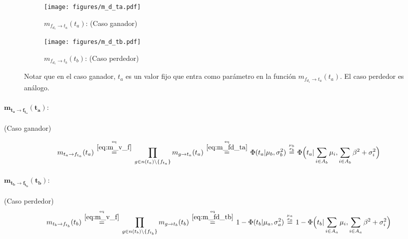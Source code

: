 \documentclass[article]{jss}
\newcommand\hfrac[2]{\genfrac{}{}{0pt}{}{#1}{#2}} %
\begin{document}
\begin{appendix}
\begin{figure}[t!]
\centering
  \begin{subfigure}[t]{0.48\textwidth}
  \texttt{[image: figures/m\_d\_ta.pdf]}
  \caption{$m_{f_{d_1} \rightarrow t_a}(t_a)$: (Caso ganador)}
  \label{fig:m_fd_ta}
  \end{subfigure}
  \begin{subfigure}[t]{0.48\textwidth}
  \texttt{[image: figures/m\_d\_tb.pdf]}
  \caption{$m_{f_{d_1} \rightarrow t_b}(t_b)$: (Caso perdedor)}
  \label{fig:m_fd_tb}
  \end{subfigure}
  \caption{Notar que en el caso ganador, $t_a$ es un valor fijo que entra como par\'ametro en la funci\'on $m_{f_{d_1} \rightarrow t_a}(t_a)$. El caso perdedor es an\'alogo.}
  \label{fig:m_fd_t}
\end{figure}

\paragraph{$\bm{m_{t_a \rightarrow f_{t_a}}(t_a)}:$} (Caso ganador)

\begin{equation}\label{eq:m_ta_ft}
\begin{split}
 m_{t_a \rightarrow f_{t_a}}(t_a) \overset{\hfrac{\text{eq}}{\ref{eq:m_v_f}}}{=} \prod_{g \in n(t_a) \setminus  \{f_{t_a} \}} m_{g \rightarrow t_a} (t_a)  \overset{\hfrac{\text{eq}}{\ref{eq:m_fd_ta}}}{=} \Phi(t_a|\mu_b,\sigma_b^2) \overset{\hfrac{\mu_b}{\sigma_b}}{=} \Phi \Big(t_a| \sum_{i \in A_b} \mu_i , \sum_{i \in A_b} \beta^2 + \sigma_i^2 \Big)
\end{split}
\end{equation}

\paragraph{$\bm{m_{t_b \rightarrow f_{t_b}}(t_b)}:$} (Caso perdedor)
\begin{equation}\label{eq:m_tb_ft}
\begin{split}
 m_{t_b \rightarrow f_{t_b}}(t_b) \overset{\hfrac{\text{eq}}{\ref{eq:m_v_f}}}{=} \prod_{g \in n(t_b) \setminus  \{f_{t_b} \}} m_{g \rightarrow t_b} (t_b)  \overset{\hfrac{\text{eq}}{\ref{eq:m_fd_tb}}}{=} 1- \Phi(t_b|\mu_a,\sigma_a^2) \overset{\hfrac{\mu_a}{\sigma_a}}{=} 1 - \Phi \Big(t_b| \sum_{i \in A_a} \mu_i , \sum_{i \in A_a} \beta^2 + \sigma_i^2 \Big)
\end{split}
\end{equation}




\end{appendix}
\end{document}
